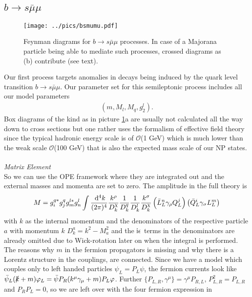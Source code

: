 \subsection{$b\rightarrow s\bar\mu\mu$}
\label{sec_bsmumu}
\begin{figure}[t]
 \texttt{[image: ../pics/bsmumu.pdf]}
 \caption{Feynman diagrams for $b\rightarrow s \bar\mu\mu$ processes. In case of a Majorana particle being able to mediate such processes, crossed
 diagrams as (b) contribute (see text).}
 \label{pic_Bsmumu}
\end{figure}
Our first process targets anomalies in decays being induced by the quark level transition $b\rightarrow s\bar\mu\mu$. Our parameter set for this 
semileptonic process includes all our model parameters
\begin{align}
 \left(m, M_l, M_q, g_2^l\right).
\end{align}
Box diagrams of the kind as in picture \ref{pic_Bsmumu}a are usually not calculated 
all the way down to cross sections but one rather uses the formalism of effective field theory since the typical hadronic energy scale is of
$\mathcal{O}$(1 GeV) which is much lower than the weak scale $\mathcal{O}$(100 GeV) that is also the expected mass scale of our NP states. 
\\ \\ \noindent \textit{Matrix Element}\\
\noindent So we can use 
the OPE framework where they are integrated out and the external masses and momenta are set to zero. The amplitude in the full theory is
\begin{align}
 M =g_i^{q*} g_j^{q} g_m^{l*} g_n^l\int \frac{\; \mathrm{d}^4 k}{(2\pi)^4} \frac{k^\rho}{D^\chi_k}\frac{1}{D^q_k} \frac{1}{D^l_k} \frac{k^\sigma}{D^\chi_k} \left(\bar L_L^n \gamma_\rho Q_L^j\right) \left(\bar Q_L^i \gamma_\sigma L_L^m\right)
 \label{eq_matElemBSmumu}
\end{align}
with $k$ as the internal momentum and the denominators of the respective particle $a$ with momentum $k$ $D^a_k = k^2-M_a^2$ and the $\text{i}\epsilon$ terms in the denominators are already omitted
due to Wick-rotation later on when the integral is performed. The reasons why $m$ in the fermion propagators is missing
and why there is a Lorentz structure in the couplings, are connected. Since we have a model which couples only to left handed particles $\psi_L = P_L \psi$,
the fermion currents look like $\bar \psi_L (\slashed{k}+m)\varphi_L = \bar \psi P_R (k^\mu \gamma_\mu+m) P_L\varphi$. Further
$\{P_{L,R},\gamma^\mu\} = \gamma^\mu P_{R,L}$, $P_{L,R}^2 = P_{L,R}$ and $P_R P_L = 0$, so we are left over with the four fermion expression in 
